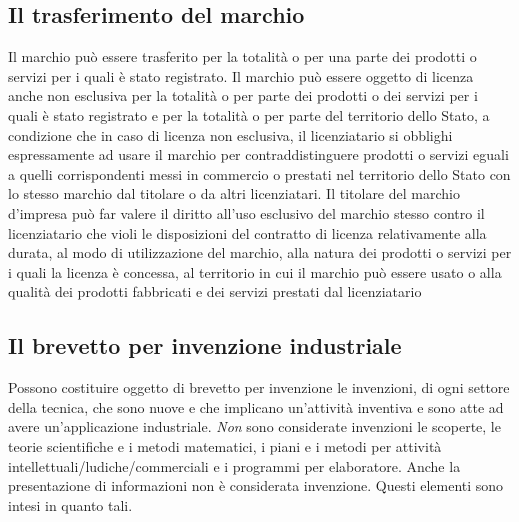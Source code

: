 \subsection{Il trasferimento del marchio}
Il marchio può essere trasferito per la totalità o per una parte dei prodotti o servizi per i quali è stato registrato. \newline
Il marchio può essere oggetto di licenza anche non esclusiva per la totalità o per parte dei prodotti o dei servizi
per i quali è stato registrato e per la totalità o per parte del territorio dello Stato, a condizione che in caso di licenza non esclusiva,
il licenziatario si obblighi espressamente ad usare il marchio per contraddistinguere prodotti o servizi eguali a quelli corrispondenti
messi in commercio o prestati nel territorio dello Stato con lo stesso marchio dal titolare o da altri licenziatari. \newline
Il titolare del marchio d'impresa può far valere il diritto all'uso esclusivo del marchio stesso contro il licenziatario che violi le disposizioni
del contratto di licenza relativamente alla durata, al modo di utilizzazione del marchio, alla natura dei prodotti o servizi per i quali la licenza
è concessa, al territorio in cui il marchio può essere usato o alla qualità dei prodotti fabbricati e dei servizi prestati dal
licenziatario

\subsection{Il brevetto per invenzione industriale}
Possono costituire oggetto di brevetto per invenzione le invenzioni, di ogni settore della tecnica, che sono nuove e che implicano
un'attività inventiva e sono atte ad avere un'applicazione industriale.\newline
\emph{Non} sono considerate invenzioni le scoperte, le teorie scientifiche e i metodi matematici, i piani
e i metodi per attività intellettuali/ludiche/commerciali e i programmi per elaboratore. Anche la presentazione di informazioni non è
considerata invenzione.\newline
Questi elementi sono intesi in quanto tali.

